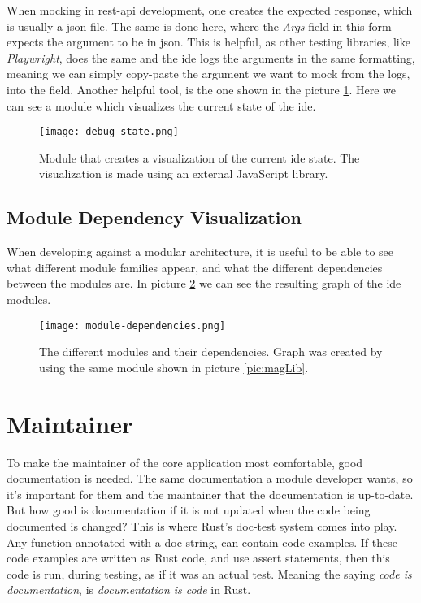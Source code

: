 When mocking in \gls*{rest}-\gls*{api} development, one creates the expected
response, which is usually a \gls*{json}-file. The same is done here, where the
\textit{Args} field in this form expects the argument to be in \gls*{json}. This
is helpful, as other testing libraries, like \textit{Playwright}, does the same
and the \gls*{ide} logs the arguments in the same formatting, meaning we
can simply copy-paste the argument we want to mock from the logs, into the
field. Another helpful tool, is the one shown in the picture
\ref{pic:debugState}. Here we can see a module which visualizes the current
state of the \gls*{ide}.

\begin{figure}[H]
  \centering
  \texttt{[image: debug-state.png]}
  \caption{
    Module that creates a visualization of the current \gls*{ide} state. The
    visualization is made using an external JavaScript library.
  }
  \label{pic:debugState}
\end{figure}


\subsection{Module Dependency Visualization}

When developing against a modular architecture, it is useful to be able to see
what different module families appear, and what the different dependencies
between the modules are. In picture \ref{pic:modDep} we can see the resulting
graph of the \gls*{ide} modules.

\begin{figure}[H]
  \centering
  \texttt{[image: module-dependencies.png]}
  \caption{
    The different modules and their dependencies. Graph was created by using the
    same module shown in picture \ref{pic:magLib}.
  }
  \label{pic:modDep}
\end{figure}


\section{Maintainer}

To make the maintainer of the core application most comfortable, good
documentation is needed. The same documentation a module developer wants, so
it's important for them and the maintainer that the documentation is up-to-date.
But how good is documentation if it is not updated when the code being
documented is changed? This is where Rust's doc-test system comes into play. Any
function annotated with a doc string, can contain code examples. If these code
examples are written as Rust code, and use assert statements, then this code is
run, during testing, as if it was an actual test. Meaning the saying
\textit{code is documentation}, is \textit{documentation is code} in Rust.

